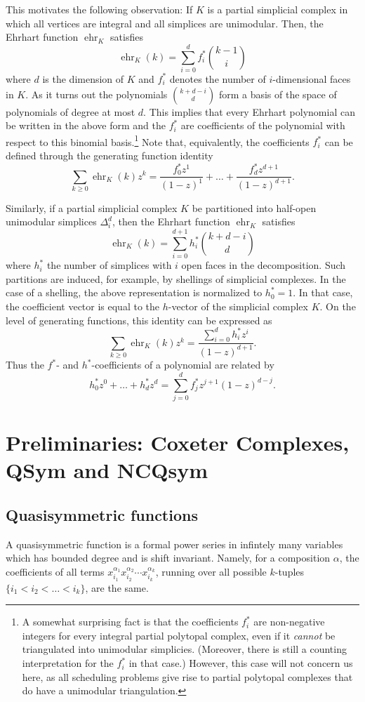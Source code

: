 \documentclass[12pt,reqno]{amsart}
\numberwithin{definition}{section}
\newcommand{\ehr}{\operatorname{ehr}}
\begin{document}
This motivates the following observation: If $K$ is a partial simplicial complex in which all vertices are integral and all simplices are unimodular. Then, the Ehrhart function $\ehr_K$ satisfies
\[
  \ehr_K(k) = \sum_{i=0}^d f_i^* \binom{k-1}{i}
\]
where $d$ is the dimension of $K$ and $f_i^*$ denotes the number of $i$-dimensional faces in $K$. As it turns out the polynomials $\binom{k+d-i}{d}$ form a basis of the space of polynomials of degree at most $d$. This implies that every Ehrhart polynomial can be written in the above form and the $f_i^*$ are coefficients of the polynomial with respect to this binomial basis.\footnote{A somewhat surprising fact is that the coefficients $f_i^*$ are non-negative integers for every integral partial polytopal complex, even if it \emph{cannot} be triangulated into unimodular simplicies. (Moreover, there is still a counting interpretation for the $f_i^*$ in that case.) However, this case will not concern us here, as all scheduling problems give rise to partial polytopal complexes that do have a unimodular triangulation.} Note that, equivalently, the coefficients $f_i^*$ can be defined through the generating function identity
\[
\sum_{k \geq 0}\ehr_K(k) z^k = \frac{f^*_0 z^1}{(1-z)^1} + \ldots + \frac{f^*_d z^{d+1}}{(1-z)^{d+1}}.
\]

Similarly, if a partial simplicial complex $K$ be partitioned into half-open unimodular simplices $\Delta^d_i$, then the Ehrhart function $\ehr_K$ satisfies
\[
  \ehr_K(k) = \sum_{i=0}^{d+1} h_i^* \binom{k+d-i}{d}
\]
where $h_i^*$ the number of simplices with $i$ open faces in the decomposition. Such partitions are induced, for example, by shellings of simplicial complexes. In the case of a shelling, the above representation is normalized to $h_0^* = 1$. In that case, the coefficient vector is equal to the $h$-vector of the simplicial complex $K$. On the level of generating functions, this identity can be expressed as
\[
  \sum_{k \geq 0} \ehr_K(k) z^k = \frac{\sum_{i=0}^d h_i^* z^i}{(1-z)^{d+1}}.
\]
Thus the $f^*$- and $h^*$-coefficients of a polynomial are related by
\[
  h^*_0z^0 + \ldots + h^*_d z^d = \sum_{j=0}^d f^*_j z^{j+1} (1-z)^{d-j}.
\]

\section{Preliminaries: Coxeter Complexes, QSym and NCQsym}
\label{sec:prelim-qsym}

\subsection{Quasisymmetric functions}
A quasisymmetric function is a formal power series in infintely many
variables which has bounded degree and is shift invariant.  Namely, for
a composition $\alpha$, the coefficients of all terms
$x_{i_1}^{\alpha_1}x_{i_2}^{\alpha_2} \cdots x_{i_k}^{\alpha_k}$,
running over all possible $k$-tuples $\{i_1 < i_2 < \ldots < i_k \}$, are
the same.
\end{document}
